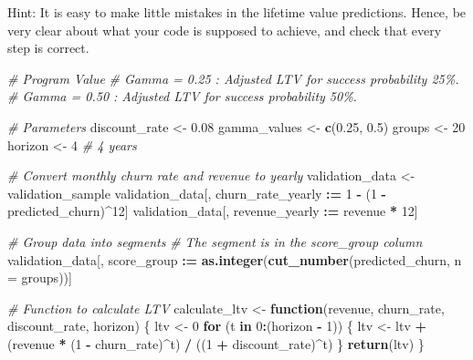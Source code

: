 \documentclass[
]{article}
\newenvironment{Shaded}{\begin{snugshade}}{\end{snugshade}}
\newcommand{\AttributeTok}[1]{\textcolor[rgb]{0.13,0.29,0.53}{#1}}
\newcommand{\CommentTok}[1]{\textcolor[rgb]{0.56,0.35,0.01}{\textit{#1}}}
\newcommand{\ControlFlowTok}[1]{\textcolor[rgb]{0.13,0.29,0.53}{\textbf{#1}}}
\newcommand{\DecValTok}[1]{\textcolor[rgb]{0.00,0.00,0.81}{#1}}
\newcommand{\FloatTok}[1]{\textcolor[rgb]{0.00,0.00,0.81}{#1}}
\newcommand{\FunctionTok}[1]{\textcolor[rgb]{0.13,0.29,0.53}{\textbf{#1}}}
\newcommand{\NormalTok}[1]{#1}
\newcommand{\OtherTok}[1]{\textcolor[rgb]{0.56,0.35,0.01}{#1}}
\newcommand{\SpecialCharTok}[1]{\textcolor[rgb]{0.81,0.36,0.00}{\textbf{#1}}}
\begin{document}
\medskip

Hint: It is easy to make little mistakes in the lifetime value
predictions. Hence, be very clear about what your code is supposed to
achieve, and check that every step is correct.

\begin{Shaded}
\begin{Highlighting}[]
\CommentTok{\# Program Value }
\CommentTok{\# Gamma = 0.25 : Adjusted LTV for success probability 25\%.}
\CommentTok{\# Gamma = 0.50 : Adjusted LTV for success probability 50\%.}

\CommentTok{\# Parameters}
\NormalTok{discount\_rate }\OtherTok{\textless{}{-}} \FloatTok{0.08}
\NormalTok{gamma\_values }\OtherTok{\textless{}{-}} \FunctionTok{c}\NormalTok{(}\FloatTok{0.25}\NormalTok{, }\FloatTok{0.5}\NormalTok{)}
\NormalTok{groups }\OtherTok{\textless{}{-}} \DecValTok{20}
\NormalTok{horizon }\OtherTok{\textless{}{-}} \DecValTok{4}  \CommentTok{\# 4 years}

\CommentTok{\# Convert monthly churn rate and revenue to yearly}
\NormalTok{validation\_data }\OtherTok{\textless{}{-}}\NormalTok{ validation\_sample }
\NormalTok{validation\_data[, churn\_rate\_yearly }\SpecialCharTok{:=} \DecValTok{1} \SpecialCharTok{{-}}\NormalTok{ (}\DecValTok{1} \SpecialCharTok{{-}}\NormalTok{ predicted\_churn)}\SpecialCharTok{\^{}}\DecValTok{12}\NormalTok{]}
\NormalTok{validation\_data[, revenue\_yearly }\SpecialCharTok{:=}\NormalTok{ revenue }\SpecialCharTok{*} \DecValTok{12}\NormalTok{]}

\CommentTok{\# Group data into segments }
\CommentTok{\# The segment is in the score\_group column}
\NormalTok{validation\_data[, score\_group }\SpecialCharTok{:=} \FunctionTok{as.integer}\NormalTok{(}\FunctionTok{cut\_number}\NormalTok{(predicted\_churn, }\AttributeTok{n =}\NormalTok{ groups))]}

\CommentTok{\# Function to calculate LTV}
\NormalTok{calculate\_ltv }\OtherTok{\textless{}{-}} \ControlFlowTok{function}\NormalTok{(revenue, churn\_rate, discount\_rate, horizon) \{}
\NormalTok{  ltv }\OtherTok{\textless{}{-}} \DecValTok{0}
  \ControlFlowTok{for}\NormalTok{ (t }\ControlFlowTok{in} \DecValTok{0}\SpecialCharTok{:}\NormalTok{(horizon }\SpecialCharTok{{-}} \DecValTok{1}\NormalTok{)) \{}
\NormalTok{    ltv }\OtherTok{\textless{}{-}}\NormalTok{ ltv }\SpecialCharTok{+}\NormalTok{ (revenue }\SpecialCharTok{*}\NormalTok{ (}\DecValTok{1} \SpecialCharTok{{-}}\NormalTok{ churn\_rate)}\SpecialCharTok{\^{}}\NormalTok{t) }\SpecialCharTok{/}\NormalTok{ ((}\DecValTok{1} \SpecialCharTok{+}\NormalTok{ discount\_rate)}\SpecialCharTok{\^{}}\NormalTok{t)}
\NormalTok{  \}}
  \FunctionTok{return}\NormalTok{(ltv)}
\NormalTok{\}}
\end{Highlighting}
\end{Shaded}
\end{document}

